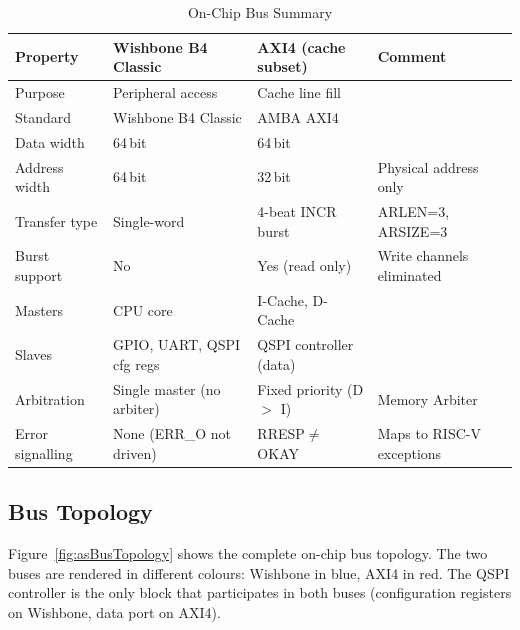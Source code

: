 \begin{table}[H]
\caption{On-Chip Bus Summary}
\label{tab:asDualBus}
\centering
\begin{tabularx}{\textwidth}{|l |l |l |X|}
  \hline
  Property          & Wishbone B4 Classic         & AXI4 (cache subset)      & Comment \\
  \hline
  \hline
  Purpose           & Peripheral access           & Cache line fill          & \\
  \hline
  Standard          & Wishbone B4 Classic         & AMBA AXI4                & \\
  \hline
  Data width        & 64\,bit                     & 64\,bit                  & \\
  \hline
  Address width     & 64\,bit                     & 32\,bit                  & Physical address only \\
  \hline
  Transfer type     & Single-word                 & 4-beat INCR burst        & ARLEN=3, ARSIZE=3 \\
  \hline
  Burst support     & No                          & Yes (read only)          & Write channels eliminated \\
  \hline
  Masters           & CPU core                    & I-Cache, D-Cache         & \\
  \hline
  Slaves            & GPIO, UART, QSPI cfg regs   & QSPI controller (data)   & \\
  \hline
  Arbitration       & Single master (no arbiter)  & Fixed priority (D $>$ I) & Memory Arbiter \\
  \hline
  Error signalling  & None (ERR\_O not driven)    & RRESP$\neq$OKAY          & Maps to RISC-V exceptions \\
  \hline
\end{tabularx}
\end{table}

\subsection{Bus Topology}
\label{subsec:asBusTopology}

Figure~\ref{fig:asBusTopology} shows the complete on-chip bus topology.
The two buses are rendered in different colours: Wishbone in blue,
AXI4 in red.
The QSPI controller is the only block that participates in both buses
(configuration registers on Wishbone, data port on AXI4).

